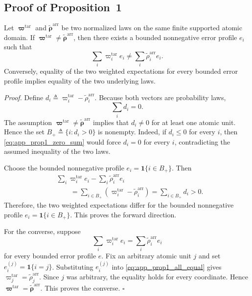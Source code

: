 \subsection{Proof of Proposition~1}
\label{app:proof_prop1}

\begin{proposition*}
Let $\boldsymbol\varpi^{\mathrm{tar}}$ and
$\widetilde{\boldsymbol\rho}^{\mathrm{arr}}$ be two normalized laws on the same
finite supported atomic domain.  If
$\boldsymbol\varpi^{\mathrm{tar}}\neq
\widetilde{\boldsymbol\rho}^{\mathrm{arr}}$, then there exists a bounded
nonnegative error profile $e_i$ such that
\begin{equation}
    \sum_i \varpi_i^{\mathrm{tar}}e_i
    \neq
    \sum_i \widetilde\rho_i^{\mathrm{arr}}e_i.
    \label{eq:app_prop1_claim}
\end{equation}
Conversely, equality of the two weighted expectations for every bounded error
profile implies equality of the two underlying laws.
\end{proposition*}

\noindent\emph{Proof.}
Define $d_i\triangleq\varpi_i^{\mathrm{tar}}-\widetilde\rho_i^{\mathrm{arr}}$.
Because both vectors are probability laws,
\begin{equation}
    \sum_i d_i=0.
    \label{eq:app_prop1_zero_sum}
\end{equation}
The assumption
$\boldsymbol\varpi^{\mathrm{tar}}\neq
\widetilde{\boldsymbol\rho}^{\mathrm{arr}}$
implies that $d_i\neq0$ for at least one atomic unit.  Hence the set
$B_+\triangleq\{i:d_i>0\}$
is nonempty.  Indeed, if $d_i\le0$ for every $i$, then
\eqref{eq:app_prop1_zero_sum} would force $d_i=0$ for every $i$, contradicting
the assumed inequality of the two laws.

Choose the bounded nonnegative profile
$e_i=\mathbf{1}\{i\in B_+\}$.
Then
\begin{align}
 &
 \sum_i
 \varpi_i^{\mathrm{tar}}e_i
 -
 \sum_i
 \widetilde\rho_i^{\mathrm{arr}}e_i
 \nonumber\\
 &\qquad=
 \sum_{i\in B_+}
 \left(
 \varpi_i^{\mathrm{tar}}
 -
 \widetilde\rho_i^{\mathrm{arr}}
 \right)
 =
 \sum_{i\in B_+}d_i
 >0.
 \label{eq:app_prop1_difference}
\end{align}
Therefore, the two weighted expectations differ for the bounded nonnegative
profile $e_i=\mathbf{1}\{i\in B_+\}$.  This proves the forward direction.

For the converse, suppose
\begin{equation}
    \sum_i \varpi_i^{\mathrm{tar}}e_i
    =
    \sum_i \widetilde\rho_i^{\mathrm{arr}}e_i
    \label{eq:app_prop1_all_equal}
\end{equation}
for every bounded error profile $e$.  Fix an arbitrary atomic unit $j$ and set
$e_i^{(j)}=\mathbf{1}\{i=j\}$.
Substituting $e_i^{(j)}$ into
\eqref{eq:app_prop1_all_equal} gives
$\varpi_j^{\mathrm{tar}}=\widetilde\rho_j^{\mathrm{arr}}$.
Since $j$ was arbitrary, the equality holds for every coordinate.  Hence
$\boldsymbol\varpi^{\mathrm{tar}}=\widetilde{\boldsymbol\rho}^{\mathrm{arr}}$.
This proves the converse. \hfill$\square$

